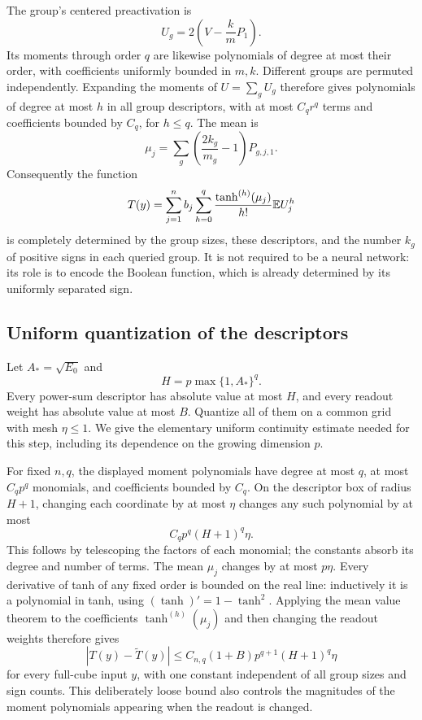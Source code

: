 The group's centered preactivation is
\[
 U_g=2\left(V-\frac{k}{m}P_1\right).
\]
Its moments through order $q$ are likewise polynomials of degree at most their order, with coefficients uniformly bounded in $m,k$. Different groups are permuted independently. Expanding the moments of $U=\sum_gU_g$ therefore gives polynomials of degree at most $h$ in all group descriptors, with at most $C_q r^q$ terms and coefficients bounded by $C_q$, for $h\le q$. The mean is
\[
 \mu_j=\sum_g\left(\frac{2k_g}{m_g}-1\right)P_{g,j,1}.
\]
Consequently the function
\begin{equation}\label{eq:descriptor-predictor}
 T(y)=\sum_{j=1}^n b_j
       \sum_{h=0}^q\frac{\tanh^{(h)}(\mu_j)}{h!}\mathbb E U_j^h
\end{equation}
is completely determined by the group sizes, these descriptors, and the number $k_g$ of positive signs in each queried group. It is not required to be a neural network: its role is to encode the Boolean function, which is already determined by its uniformly separated sign.

\subsection{Uniform quantization of the descriptors}
Let $A_* =\sqrt{E_0}$ and
\[
 H=p\max\{1,A_*\}^q.
\]
Every power-sum descriptor has absolute value at most $H$, and every readout weight has absolute value at most $B$. Quantize all of them on a common grid with mesh $\eta\le1$. We give the elementary uniform continuity estimate needed for this step, including its dependence on the growing dimension $p$.

For fixed $n,q$, the displayed moment polynomials have degree at most $q$, at most $C_qp^q$ monomials, and coefficients bounded by $C_q$. On the descriptor box of radius $H+1$, changing each coordinate by at most $\eta$ changes any such polynomial by at most
\[
 C_q p^q (H+1)^q\eta.
\]
This follows by telescoping the factors of each monomial; the constants absorb its degree and number of terms. The mean $\mu_j$ changes by at most $p\eta$. Every derivative of tanh of any fixed order is bounded on the real line: inductively it is a polynomial in tanh, using $(\tanh)'=1-\tanh^2$. Applying the mean value theorem to the coefficients $\tanh^{(h)}(\mu_j)$ and then changing the readout weights therefore gives
\begin{equation}\label{eq:descriptor-lipschitz}
 |T(y)-\widetilde T(y)|
 \le C_{n,q}(1+B)p^{q+1}(H+1)^q\eta
\end{equation}
for every full-cube input $y$, with one constant independent of all group sizes and sign counts. This deliberately loose bound also controls the magnitudes of the moment polynomials appearing when the readout is changed.

